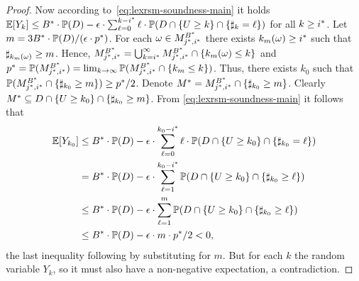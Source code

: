 \begin{proof}
Now according to~\eqref{eq:lexrsm-soundness-main} it holds  $\mathbb{E}[Y_k]\leq {B}^*\cdot \mathbb{P}(D) - \epsilon\cdot\sum_{\ell=0}^{k-{i}^*} \ell\cdot\mathbb{P}(D 
\cap \{U\geq k\} \cap \{\sharp_k 
= 
\ell\})$ for all $k\geq {i}^*$. Let $m=3{B}^*\cdot \mathbb{P}(D)/(\epsilon\cdot {p}^*)$. For each $\omega\in M_{{j}^*,{i}^*}^{{B}^*} $ there exists $k_m(\omega)\geq {i}^*$ such that $\sharp_{k_{m}(\omega)}\geq m$. Hence, $M_{{j}^*,{i}^*}^{{B}^*} = \bigcup_{k={i}^*}^{\infty} M_{{j}^*,{i}^*}^{{B}^*} \cap \{k_{m}(\omega) \leq k\}$ and ${p}^*=\mathbb{P}(M_{{j}^*,{i}^*}^{{B}^*})=\lim_{k\rightarrow \infty}\mathbb{P}(M_{{j}^*,{i}^*}^{{B}^*} \cap \{k_{m} \leq k\})$. Thus, there exists $k_0$ such that $\mathbb{P}(M_{{j}^*,{i}^*}^{{B}^*} \cap \{\sharp_{k_0}\geq m\}) \geq {p}^*/2$. Denote ${M}^*= M_{{j}^*,{i}^*}^{{B}^*} \cap \{\sharp_{k_0}\geq m\}$. Clearly ${M}^* \subseteq D\cap \{U\geq k_0 \} \cap \{\sharp_{k_0}\geq m \}$. From \eqref{eq:lexrsm-soundness-main} it follows that
\begin{align*}
\mathbb{E}[Y_{k_0}]&\leq {B}^*\cdot \mathbb{P}(D) - \epsilon\cdot\sum_{\ell=0}^{k_0-{i}^*} \ell\cdot\mathbb{P}(D 
\cap \{U\geq k_0\} \cap \{\sharp_{k_0} 
=
\ell\}) \\
&= {B}^*\cdot \mathbb{P}(D) - \epsilon\cdot \sum_{\ell=1}^{k_0-{i}^*} \mathbb{P}(D 
\cap \{U\geq k_0\} \cap \{\sharp_{k_0} 
\geq 
\ell\})\\
& \leq {B}^*\cdot \mathbb{P}(D) - \epsilon\cdot \sum_{\ell=1}^{m} \mathbb{P}(D 
\cap \{U\geq k_0\} \cap \{\sharp_{k_0} 
\geq 
\ell\})\\
&\leq {B}^*\cdot \mathbb{P}(D) - \epsilon\cdot m \cdot {p}^*/2 < 0, 
\end{align*}
the last inequality following by substituting for $m$. But for each $k$ the random variable $Y_k$, so it must also have a non-negative expectation, a contradiction.


	


% 
\end{proof}